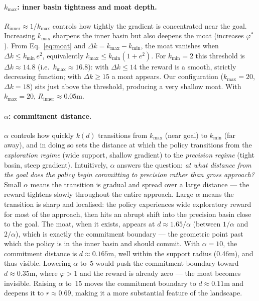 \documentclass{article}
\begin{document}
\paragraph{$k_{\max}$: inner basin tightness and moat depth.}
$R_{\mathrm{inner}} \approx 1/k_{\max}$ controls how tightly the gradient is
concentrated near the goal. Increasing $k_{\max}$ sharpens the inner basin but also
deepens the moat (increases $\varphi^*$). From Eq.~\eqref{eq:moat} and
$\Delta k = k_{\max} - k_{\min}$, the moat vanishes when $\Delta k \leq k_{\min}\,e^2$,
equivalently $k_{\max} \leq k_{\min}(1+e^2)$. For $k_{\min}=2$ this threshold is
$\Delta k \approx 14.8$ (i.e.\ $k_{\max} \approx 16.8$): with $\Delta k \leq 14$ the
reward is a smooth, strictly decreasing function; with $\Delta k \geq 15$ a moat
appears. Our configuration ($k_{\max}=20$, $\Delta k = 18$) sits just above the threshold,
producing a very shallow moat. With $k_{\max}=20$, $R_{\mathrm{inner}} \approx 0.05$m.

\paragraph{$\alpha$: commitment distance.}
$\alpha$ controls how quickly $k(d)$ transitions from $k_{\max}$ (near goal) to
$k_{\min}$ (far away), and in doing so sets the distance at which the policy transitions
from the \emph{exploration regime} (wide support, shallow gradient) to the
\emph{precision regime} (tight basin, steep gradient). Intuitively, $\alpha$ answers
the question: \emph{at what distance from the goal does the policy begin committing to
precision rather than gross approach?} Small $\alpha$ means the transition is gradual
and spread over a large distance --- the reward tightens slowly throughout the entire
approach. Large $\alpha$ means the transition is sharp and localised: the policy
experiences wide exploratory reward for most of the approach, then hits an abrupt
shift into the precision basin close to the goal.
The moat, when it exists, appears at $d \approx 1.65/\alpha$
(between $1/\alpha$ and $2/\alpha$), which is exactly the commitment boundary ---
the geometric point past which the policy is in the inner basin and should commit.
With $\alpha=10$, the commitment distance is $d\approx 0.165$m, well within the support radius (0.46m), and thus visible.
Lowering $\alpha$ to~5 would push the commitment boundary toward $d\approx 0.35$m, where
$\varphi > 1$ and the reward is already zero --- the moat becomes invisible.
Raising $\alpha$ to~15 moves the commitment boundary to $d\approx 0.11$m and deepens it to $r\approx 0.69$,
making it a more substantial feature of the landscape.
\end{document}
